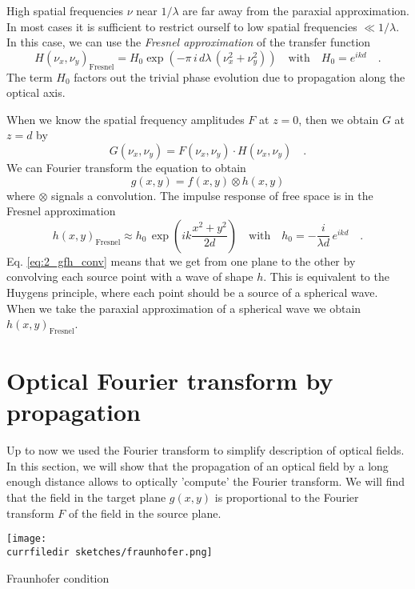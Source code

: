 High spatial frequencies $\nu$ near $1/\lambda$ are far away from the paraxial approximation. In most cases it is sufficient to restrict ourself to low spatial frequencies $ \ll 1/\lambda$. In this case, we can use the \emph{Fresnel approximation} of the transfer function
\begin{equation}
    H(\nu_x, \nu_y)_\text{Fresnel} = H_0 \exp \left(  
    -  \pi \, i  \, d \lambda \, (
 \nu_x^2 + \nu_y^2 )
    \right) \quad \text{with} \quad H_0 = e^{i k d} \quad .
\end{equation}
The term $H_0$ factors out the trivial phase evolution due to propagation along the optical axis.

When we know the spatial frequency amplitudes $F$ at $z=0$, then we obtain $G$ at $z=d$ by
\begin{equation}
    G(\nu_x, \nu_y) =  F(\nu_x, \nu_y) \cdot  H(\nu_x, \nu_y) \quad .
\end{equation}
We can Fourier transform the equation to obtain 
\begin{equation}
    g(x,y) = f(x,y) \otimes h(x,y) \label{eq:2_gfh_conv}
\end{equation}
where $\otimes$ signals a convolution. The impulse response of free space is in the Fresnel approximation
\begin{equation}
    h(x,y)_\text{Fresnel} \approx h_0 \, \exp \left(i k \frac{x^2 + y^2 }{2d} \right) \quad \text{with} \quad
    h_0 = -\frac{i}{\lambda d} \,  e^{i k d } \quad .
\end{equation}
Eq. \ref{eq:2_gfh_conv} means that we get from one plane to the other by convolving each source point with a wave of shape $h$. This is equivalent to the Huygens principle, where each point should be a source of a spherical wave. When we take the paraxial approximation of a spherical wave we obtain $ h(x,y)_\text{Fresnel}$.


\section{Optical Fourier transform by propagation}

Up to now we used the Fourier transform to simplify description of optical fields. In this section, we will show that the propagation of an optical field by a long enough distance allows to optically 'compute' the Fourier transform. We will find that the field in the target plane $g(x,y)$ is proportional to the Fourier transform $F$ of the field in the source plane.

\begin{marginfigure}
    \texttt{[image: \\currfiledir sketches/fraunhofer.png]}
    \caption{Fraunhofer condition}
\end{marginfigure}

